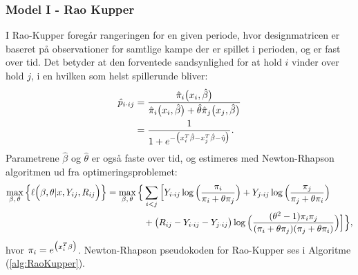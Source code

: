 \documentclass[11pt,a4paper]{article}
\begin{document}
\subsubsection{Model I - Rao Kupper}
I Rao-Kupper foregår rangeringen for en given periode, hvor designmatricen er baseret på observationer for samtlige kampe der er spillet i perioden, og er fast over tid. Det betyder at den forventede sandsynlighed for at hold $i$ vinder over hold $j$, i en hvilken som helst spillerunde bliver:
\begin{align}
    \hat{p}_{i\cdot ij}    &=\frac{\hat{\pi}_i\big{(}x_i,\hat{\beta}\big{)}}{\hat{\pi}_i\big{(}x_i,\hat{\beta}\big{)}+\hat{\theta}\hat{\pi}_j\big{(}x_j,\hat{\beta}\big{)}}\\
    &=\frac{1}{1+e^{-\big{(}x_i^T\hat{\beta}-x_j^T\hat{\beta}-\hat{\eta}\big{)}}}.
\end{align}
Parametrene $\hat{\beta}$ og $\hat{\theta}$ er også faste over tid, og estimeres med Newton-Rhapson algoritmen ud fra optimeringsproblemet:
\begin{align*}
\max_{\beta,\,\theta} \Big{\{}\ell\Big{(}\beta,\theta|x,Y_{ij},R_{ij}\Big{)}\Big{\}}=
\max_{\beta,\,\theta} \Big{\{}& \sum_{i<j}\Big{[}Y_{i\cdot ij}\log\Big{(}\frac{\pi_i}{\pi_i+\theta\pi_j}\Big{)}
+ Y_{j\cdot ij}\log\Big{(}\frac{\pi_j}{\pi_j+\theta\pi_i}\Big{)}\\
&+ \big{(}R_{ij}-Y_{i\cdot ij}-Y_{j\cdot ij}\big{)} \log\Big{(}\frac{(\theta^2-1)\pi_i \pi_j}{(\pi_i+\theta\pi_j)(\pi_j+\theta\pi_i)}\Big{)}\Big{]}\Big{\}},\\
\end{align*}
 hvor $\pi_i=e^{\big{(}x_i^T\beta\big{)}}$. Newton-Rhapson pseudokoden for Rao-Kupper ses i Algoritme (\ref{alg:RaoKupper}).
 \\
\end{document}
